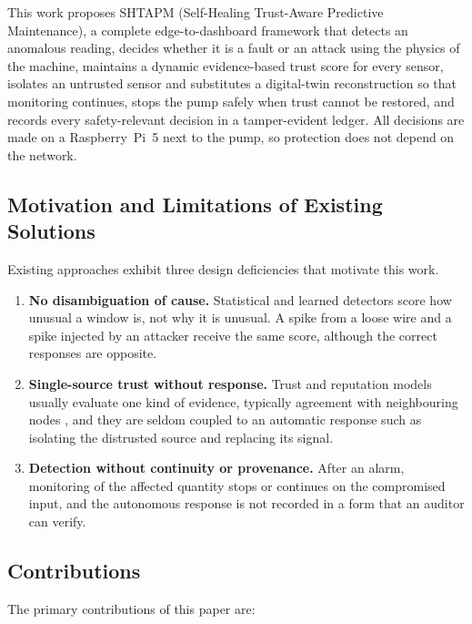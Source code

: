 \documentclass[11pt,a4paper]{article}
\begin{document}
This work proposes SHTAPM (Self-Healing Trust-Aware Predictive Maintenance), a complete edge-to-dashboard framework that detects an anomalous reading, decides whether it is a fault or an attack using the physics of the machine, maintains a dynamic evidence-based trust score for every sensor, isolates an untrusted sensor and substitutes a digital-twin reconstruction so that monitoring continues, stops the pump safely when trust cannot be restored, and records every safety-relevant decision in a tamper-evident ledger. All decisions are made on a Raspberry~Pi~5 next to the pump, so protection does not depend on the network.

\subsection{Motivation and Limitations of Existing Solutions}

Existing approaches exhibit three design deficiencies that motivate this work.

\begin{enumerate}
  \item \textbf{No disambiguation of cause.} Statistical and learned detectors score how unusual a window is, not why it is unusual. A spike from a loose wire and a spike injected by an attacker receive the same score, although the correct responses are opposite.
  \item \textbf{Single-source trust without response.} Trust and reputation models usually evaluate one kind of evidence, typically agreement with neighbouring nodes \cite{josang2002beta,ganeriwal2008reputation,bao2012dynamic}, and they are seldom coupled to an automatic response such as isolating the distrusted source and replacing its signal.
  \item \textbf{Detection without continuity or provenance.} After an alarm, monitoring of the affected quantity stops or continues on the compromised input, and the autonomous response is not recorded in a form that an auditor can verify.
\end{enumerate}

\subsection{Contributions}

The primary contributions of this paper are:
\end{document}

